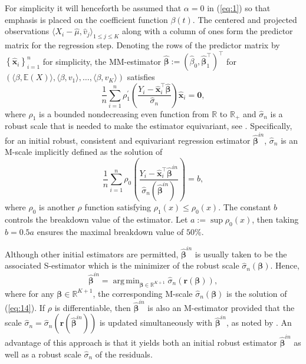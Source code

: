 \documentclass[11pt]{article}
\DeclareMathOperator*{\argmin}{arg\,min}
\begin{document}
For simplicity it will henceforth be assumed that $\alpha = 0$ in (\ref{eq:1}) so that emphasis is placed on the coefficient function $\beta(t)$. The centered and projected observations $\langle X_i - \widehat{\mu}, \widehat{v}_j \rangle_{1 \leq j \leq K }$ along with a column of ones form the predictor matrix for the regression step. Denoting the rows of the predictor matrix by $\left\{\widehat{\mathbf{x}}_i\right\}_{i=1}^n$ for simplicity, the MM-estimator $\widehat{\boldsymbol{\beta}} := ( \widehat{\beta}_0, \boldsymbol{\widehat{\beta}}_1^{\top})^{\top}$ for $\left( \langle \beta, \mathbb{E}(X) \rangle, \langle \beta, v_1 \rangle, \ldots, \langle \beta, v_K \rangle \right)$ satisfies
\begin{equation}
\label{eq:13}
\frac{1}{n}\sum_{i=1}^n \rho^{\prime}_1 \left( \frac{Y_i - \mathbf{\widehat{x}}_i^{\top} \boldsymbol{\widehat{\beta}} }{\widehat{\sigma}_n} \right) \mathbf{\widehat{x}}_i = \mathbf{0},
\end{equation}
where  $\rho_1$ is a bounded nondecreasing even function from $\mathbb{R}$ to $\mathbb{R}_{+}$ and $\widehat{\sigma}_n$ is a robust scale that is needed to make the estimator equivariant, see \cite{maronna2006robust}. Specifically, for an initial robust, consistent and equivariant regression estimator $\boldsymbol{\widehat{\beta}}^{in}$, $\widehat{\sigma}_n$ is an M-scale implicitly defined  as the solution of 
\begin{equation}
\label{eq:14}
\frac{1}{n} \sum_{i=1}^n \rho_{0} \left( \frac{Y_i - \mathbf{\widehat{x}}_i^{\top} \boldsymbol{\widehat{\beta}}^{in}}{\widehat{\sigma}_n(\boldsymbol{\widehat{\beta}}^{in})} \right) = b,
\end{equation}
where $\rho_{0}$ is another $\rho$ function satisfying $\rho_1(x) \leq \rho_{0}(x)$. The constant $b$ controls the  breakdown value of the estimator. Let $a := \sup \rho_0(x)$,  then taking $b = 0.5 a$ ensures the maximal breakdown value of $50\%$. 

Although other initial estimators are permitted, $\boldsymbol{\widehat{\beta}}^{in}$ is usually taken to be the associated S-estimator  \citep{rousseeuw1984robust} which is the minimizer of the robust scale $\widehat{\sigma}_n(\boldsymbol{\beta})$. Hence,
\begin{equation}
\boldsymbol{\widehat{\beta}}^{in} = \argmin_{\boldsymbol{\beta} \in \mathbb{R}^{K+1}} \widehat{\sigma}_n \left( \mathbf{r}(\boldsymbol{\beta}) \right),
\end{equation}
where for any $\boldsymbol{\beta} \in \mathbb{R}^{K+1}$, the corresponding M-scale $\widehat{\sigma}_n(\boldsymbol{\beta})$ is the solution of (\ref{eq:14}). If $\rho$ is differentiable, then $\widehat{\boldsymbol{\beta}}^{in}$ is also an M-estimator provided that the scale $\widehat{\sigma}_n = \widehat{\sigma}_n (  \mathbf{r}(\boldsymbol{\widehat{\beta}}^{in}) )$ is updated simultaneously with $\boldsymbol{\widehat{\beta}}^{in}$, as noted by \cite{maronna2006robust}. An advantage of this approach is that it yields both an initial robust estimator $\boldsymbol{\widehat{\beta}}^{in}$ as well as a robust scale $\widehat{\sigma}_n$ of the residuals.
\end{document}
